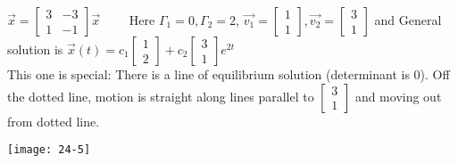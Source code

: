 \begin{example-N}
	$\vec{x} = \begin{bmatrix}
		3 & -3\\
		1 & -1
	\end{bmatrix} \vec{x} \quad \quad$ Here $\Gamma_1 = 0, \Gamma_2 = 2$, $\vec{v_1} = \begin{bmatrix}
		1\\1
	\end{bmatrix}, \vec{v_2} = \begin{bmatrix}
		3\\1
	\end{bmatrix}$ and General solution is $\vec{x}(t) = c_1 \begin{bmatrix}
		1\\2
	\end{bmatrix} + c_2 \begin{bmatrix}
		3\\1
	\end{bmatrix} e^{2t}$\\
	This one is special: There is a line of equilibrium solution (determinant is 0). Off the dotted line, motion is straight along lines parallel to $\begin{bmatrix}
		3\\1
	\end{bmatrix}$ and moving out from dotted line.
	\begin{center}
		\texttt{[image: 24-5]}
	\end{center}
\end{example-N}